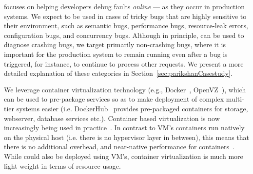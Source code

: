 \parikshan focuses on helping developers debug faults \emph{online} --- as they occur in production systems.
We expect \parikshan to be used in cases of tricky bugs that are highly sensitive to their environment, such as semantic bugs, performance bugs, resource-leak errors, configuration bugs, and concurrency bugs.
Although in principle, \parikshan can be used to diagnose crashing bugs, we target primarily non-crashing bugs, where it is important for the production system to remain running even after a bug is triggered, for instance, to continue to process other requests. 
We present a more detailed explanation of these categories in Section~\ref{sec:parikshanCasestudy}.

We leverage container virtualization technology (e.g., Docker~\cite{docker}, OpenVZ~\cite{openvz}), which can be used to pre-package services so as to make deployment of complex multi-tier systems easier (i.e. DockerHub~\cite{dockerhub,dockerhub_article} provides pre-packaged containers for storage, webserver, database services etc.).
Container based virtualization is now increasingly being used in practice~\cite{containerCloud}.
In contrast to VM's containers run natively on the physical host (i.e. there is no hypervisor layer in between), this means that there is no additional overhead, and near-native performance for containers~\cite{performanceComparisonlxcVM,performanceEvalContainers}.
While \parikshan could also be deployed using VM's, container virtualization is much more light weight in terms of resource usage.



